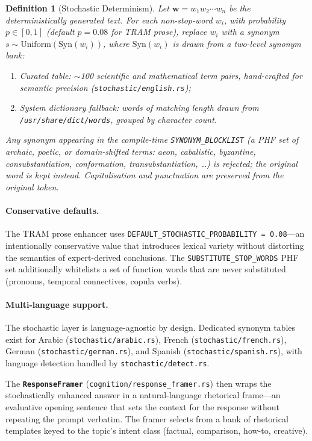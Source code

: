 \documentclass[11pt,a4paper]{article}
\newtheorem{definition}{Definition}[section]
\begin{document}
\begin{definition}[Stochastic Determinism]
Let $\mathbf{w} = w_1 w_2 \cdots w_n$ be the deterministically generated text. For each
non-stop-word $w_i$, with probability $p \in [0,1]$ (default $p = 0.08$ for TRAM prose),
replace $w_i$ with a synonym $s \sim \mathrm{Uniform}(\mathrm{Syn}(w_i))$, where $\mathrm{Syn}(w_i)$ is
drawn from a two-level synonym bank:
\begin{enumerate}[noitemsep,topsep=2pt]
  \item \emph{Curated table}: $\sim$100 scientific and mathematical term pairs, hand-crafted
        for semantic precision (\texttt{stochastic/english.rs});
  \item \emph{System dictionary fallback}: words of matching length drawn from
        \texttt{/usr/share/dict/words}, grouped by character count.
\end{enumerate}
Any synonym appearing in the compile-time \texttt{SYNONYM\_BLOCKLIST} (a PHF set of archaic,
poetic, or domain-shifted terms: \textit{aeon}, \textit{cabalistic}, \textit{byzantine},
\textit{consubstantiation}, \textit{conformation}, \textit{transubstantiation}, \ldots) is
rejected; the original word is kept instead.
Capitalisation and punctuation are preserved from the original token.
\end{definition}

\paragraph{Conservative defaults.}
The TRAM prose enhancer uses \texttt{DEFAULT\_STOCHASTIC\_PROBABILITY = 0.08}---an intentionally
conservative value that introduces lexical variety without distorting the semantics of expert-derived
conclusions. The \texttt{SUBSTITUTE\_STOP\_WORDS} PHF set additionally whitelists a set of
function words that are never substituted (pronouns, temporal connectives, copula verbs).

\paragraph{Multi-language support.}
The stochastic layer is language-agnostic by design. Dedicated synonym tables exist for
Arabic (\texttt{stochastic/arabic.rs}), French (\texttt{stochastic/french.rs}),
German (\texttt{stochastic/german.rs}), and Spanish (\texttt{stochastic/spanish.rs}),
with language detection handled by \texttt{stochastic/detect.rs}.

The \textbf{\texttt{ResponseFramer}} (\texttt{cognition/response\_framer.rs}) then wraps the
stochastically enhanced answer in a natural-language rhetorical frame---an evaluative opening
sentence that sets the context for the response without repeating the prompt verbatim. The
framer selects from a bank of rhetorical templates keyed to the topic's intent class (factual,
comparison, how-to, creative).
\end{document}
